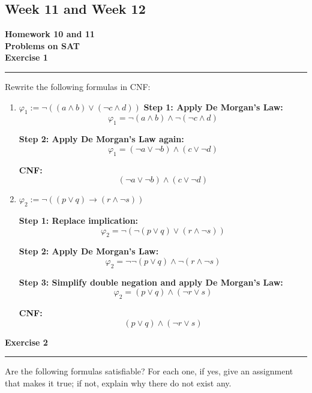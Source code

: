\documentclass{article}
\theoremstyle{theorem}
\theoremstyle{definition}
\theoremstyle{remark}
\begin{document}
\subsection{Week 11 and Week 12}
\textbf{Homework 10 and 11}\\
\textbf{Problems on SAT}\\
\textbf{Exercise 1} 
\vspace{0.5em}
\hrule
\vspace{0.5em}
Rewrite the following formulas in CNF:
\begin{enumerate}
    \item $\varphi_1 := \neg((a \land b) \lor (\neg c \land d))$
    \textbf{Step 1: Apply De Morgan's Law:}
    \[
    \varphi_1 = \neg(a \land b) \land \neg(\neg c \land d)
    \]

    \textbf{Step 2: Apply De Morgan's Law again:}
    \[
    \varphi_1 = (\neg a \lor \neg b) \land (c \lor \neg d)
    \]

    \textbf{CNF:}
    \[
    (\neg a \lor \neg b) \land (c \lor \neg d)
    \]
    \item $\varphi_2 := \neg((p \lor q) \rightarrow (r \land \neg s))$

    \textbf{Step 1: Replace implication:}
    \[
    \varphi_2 = \neg(\neg(p \lor q) \lor (r \land \neg s))
    \]

    \textbf{Step 2: Apply De Morgan's Law:}
    \[
    \varphi_2 = \neg\neg(p \lor q) \land \neg(r \land \neg s)
    \]

    \textbf{Step 3: Simplify double negation and apply De Morgan's Law:}
    \[
    \varphi_2 = (p \lor q) \land (\neg r \lor s)
    \]

    \textbf{CNF:}
    \[
    (p \lor q) \land (\neg r \lor s)
    \]
\end{enumerate}

\textbf{Exercise 2} 
\vspace{0.5em}
\hrule
\vspace{0.5em}
Are the following formulas satisfiable? For each one, if yes, give an assignment that makes it true; if not, explain why there do not exist any.
\end{document}
